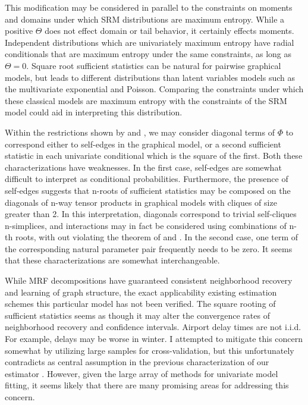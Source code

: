 \documentclass{samkoelleprelimworking}
\begin{document}
This modification may be considered in parallel to the constraints on moments and domains under which SRM distributions are maximum entropy.  While a positive $\Theta$ does not effect domain or tail behavior, it certainly effects moments.  Independent distributions which are univariately maximum entropy have radial conditionals that are maximum entropy under the same constraints, as long as $\Theta = 0$. Square root sufficient statistics can be natural for pairwise graphical models, but leads to different distributions than latent variables models such as the multivariate exponential and Poisson.  Comparing the constraints under which these classical models are maximum entropy with the constraints of the SRM model could aid in interpreting this distribution. 

Within the restrictions shown by \citep{Besag1974-qb} and \citep{Yang2013-wa}, we may consider diagonal terms of $\Phi$ to correspond either to self-edges in the graphical model, or a second sufficient statistic in each univariate conditional which is the square of the first.  Both these characterizations have weaknesses.  In the first case, self-edges are somewhat difficult to interpret as conditional probabilities.  Furthermore, the presence of self-edges suggests that n-roots of sufficient statistics may be composed on the diagonals of n-way tensor products in graphical models with cliques of size greater than 2.  In this interpretation, diagonals correspond to trivial self-cliques n-simplices, and interactions may in fact be considered using combinations of n-th roots, with out violating the theorem of \citep{Besag} and \citep{Yang}.  In the second case, one term of the corresponding natural parameter pair frequently needs to be zero.  It seems that these characterizations are somewhat interchangeable. 

While MRF decompositions have guaranteed consistent neighborhood recovery and learning of graph structure, the exact applicability existing estimation schemes this particular model has not been verified.   The square rooting of sufficient statistics seems as though it may alter the convergence rates of neighborhood recovery and confidence intervals.  Airport delay times are not i.i.d.  For example, delays may be worse in winter.  I attempted to mitigate this concern somewhat by utilizing large samples for cross-validation,  but this unfortunately contradicts as central assumption in the previous characterization of our estimator \citep{yang}.  However, given the large array of methods for univariate model fitting, it seems likely that there are many promising areas for addressing this concern.
\end{document}
